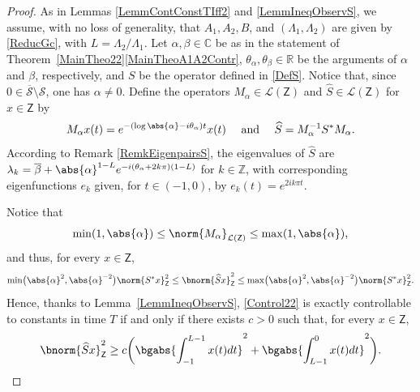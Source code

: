 \begin{proof}
As in Lemmas \ref{LemmContConstTIff2} and \ref{LemmIneqObservS}, we assume, with no loss of generality, that $A_1, A_2, B$, and $(\Lambda_1, \Lambda_2)$ are given by \eqref{ReducGc}, with $L = \Lambda_2 / \Lambda_1$. Let $\alpha, \beta \in \mathbb C$ be as in the statement of Theorem~\ref{MainTheo22}\eqref{MainTheoA1A2Contr}, $\theta_\alpha, \theta_\beta \in \mathbb R$ be the arguments of $\alpha$ and $\beta$, respectively, and $S$ be the operator defined in \eqref{DefS}. Notice that, since $0 \in \overline{\mathcal S}\setminus \mathcal S$, one has $\alpha \neq 0$. Define the operators $M_\alpha \in \mathcal L(\mathsf Z)$ and $\widehat S \in \mathcal L(\mathsf Z)$ for $x \in \mathsf Z$ by
\[M_\alpha x(t) = e^{-(\log\abs{\alpha} - i \theta_\alpha) t} x(t) \quad \text{ and } \quad \widehat S = M_{\alpha}^{-1} S^\ast M_\alpha.\]
According to Remark \ref{RemkEigenpairsS}, the eigenvalues of $\widehat S$ are $\lambda_k = \overline\beta + \abs{\alpha}^{1 - L} e^{- i (\theta_\alpha + 2 k \pi)(1 - L)}$ for $k \in \mathbb Z$, with corresponding eigenfunctions $e_k$ given, for $t \in (-1, 0)$, by $e_k(t) = e^{2 i k \pi t}$.

Notice that
\[
\min(1, \abs{\alpha}) \leq \norm{M_\alpha}_{\mathcal L(\mathsf Z)} \leq \max(1, \abs{\alpha}),
\]
and thus, for every $x \in \mathsf Z$,
\[
\min\bigl(\abs{\alpha}^2, \abs{\alpha}^{-2}\bigr) \norm{S^\ast x}_{\mathsf Z}^2 \leq \bnorm{\widehat S x}_{\mathsf Z}^2 \leq \max\bigl(\abs{\alpha}^2, \abs{\alpha}^{-2}\bigr) \norm{S^\ast x}_{\mathsf Z}^2.
\]
Hence, thanks to Lemma~\ref{LemmIneqObservS}, \eqref{Control22} is exactly controllable to constants in time $T$ if and only if there exists $c > 0$ such that, for every $x \in \mathsf Z$,
\begin{equation}
\label{IneqObservSHat}
\bnorm{\widehat S x}_{\mathsf Z}^2 \geq c \biggl(\bgabs{\int_{-1}^{L-1} x(t) dt}^2 + \bgabs{\int_{L-1}^{0} x(t) dt}^2\biggr).
\end{equation}


\end{proof}

